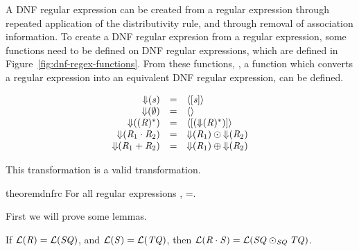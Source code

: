 A DNF regular expression can be created from a regular expression through repeated
application of the distributivity rule, and through removal of association information.
To create a DNF regular expresion from a regular expression,
some functions need to be defined on DNF regular expressions,
which are defined in Figure~\ref{fig:dnf-regex-functions}.
From these functions, \ToDNFRegex{}, a function which converts a regular expression into
an equivalent DNF regular expression, can be defined.

\begin{definition}
\leavevmode
\[
\begin{array}{rcl}
\mathit{\Downarrow}(\mathit{s}) & = & \langle[\mathit{s}]\rangle\\
\mathit{\Downarrow}(\emptyset) & = & \langle\rangle\\
\mathit{\Downarrow}((\mathit{R})^*) & = & \langle[(\mathit{\Downarrow}(\mathit{R})^*)]\rangle\\
\mathit{\Downarrow}(\mathit{R}_1\cdot\mathit{R}_2) & = & \mathit{\Downarrow}(\mathit{R}_1) \odot \mathit{\Downarrow}(\mathit{R}_2)\\
\mathit{\Downarrow}(\mathit{R}_1+\mathit{R}_2) & = & \mathit{\Downarrow}(\mathit{R}_1) \oplus \mathit{\Downarrow}(\mathit{R}_2)\\
\end{array}
\]
\end{definition}
This transformation is a valid transformation.
\begin{restatable}{theorem}{dnfrc}
\label{thm:completeness-dnf-lenses}
For all regular expressions \Regex{},
\LanguageOf{\ToDNFRegex(\Regex)}=\LanguageOf{\Regex{}}.
\end{restatable}
First we will prove some lemmas.
\begin{lemma}
If $\mathcal{L}(\mathit{R})=\mathcal{L}(\mathit{SQ})$,
and $\mathcal{L}(\mathit{S})=\mathcal{L}(\mathit{TQ})$,
then $\mathcal{L}(\mathit{R}\cdot\mathit{S})=\mathcal{L}(\mathit{SQ}\odot_{\mathit{SQ}}\mathit{TQ})$.
\end{lemma}
